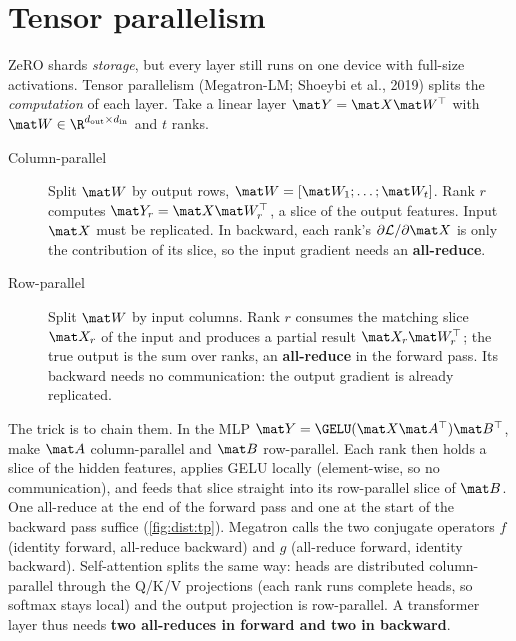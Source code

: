 \section{Tensor parallelism}\label{sec:dist:tp}

ZeRO shards \emph{storage}, but every layer still runs on one device with full-size
activations. Tensor parallelism (Megatron-LM; Shoeybi et al., 2019) splits the
\emph{computation} of each layer. Take a linear layer $\mat Y=\mat X\mat W^\top$ with
$\mat W\in\R^{d_{\text{out}}\times d_{\text{in}}}$ and $t$ ranks.

\begin{description}
\item[Column-parallel] Split $\mat W$ by output rows, $\mat W=[\mat W_1;\dots;\mat W_t]$. Rank
  $r$ computes $\mat Y_r=\mat X\mat W_r^\top$, a slice of the output features. Input $\mat X$ must
  be replicated. In backward, each rank's $\partial\mathcal L/\partial\mat X$ is only the
  contribution of its slice, so the input gradient needs an \textbf{all-reduce}.
\item[Row-parallel] Split $\mat W$ by input columns. Rank $r$ consumes the matching slice
  $\mat X_r$ of the input and produces a partial result $\mat X_r\mat W_r^\top$; the true output is
  the sum over ranks, an \textbf{all-reduce} in the forward pass. Its backward needs no
  communication: the output gradient is already replicated.
\end{description}

The trick is to chain them. In the MLP $\mat Y=\GELU(\mat X\mat A^\top)\mat B^\top$, make $\mat A$
column-parallel and $\mat B$ row-parallel. Each rank then holds a slice of the hidden features,
applies GELU locally (element-wise, so no communication), and feeds that slice straight into
its row-parallel slice of $\mat B$. One all-reduce at the end of the forward pass and one at the
start of the backward pass suffice (\cref{fig:dist:tp}). Megatron calls the two conjugate
operators $f$ (identity forward, all-reduce backward) and $g$ (all-reduce forward, identity
backward). Self-attention splits the same way: heads are distributed column-parallel through
the Q/K/V projections (each rank runs complete heads, so softmax stays local) and the output
projection is row-parallel. A transformer layer thus needs \textbf{two all-reduces in forward
and two in backward}.

